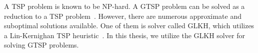\documentclass[../main.tex]{subfiles}
\begin{document}
A TSP problem is known to be NP-hard. A GTSP problem can be solved as a reduction to a TSP problem~\cite{noon1993efficient}. However, there are numerous approximate and suboptimal solutions available. One of them is solver called GLKH, which utilizes a Lin-Kernighan TSP heuristic~\cite{helsgaun2009general}. In this thesis, we utilize the GLKH solver for solving GTSP problems.





\end{document}
